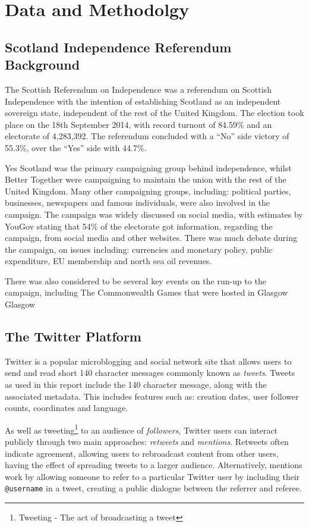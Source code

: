 \documentclass[bsc,frontabs,singlespacing,parskip]{infthesis}     %
\begin{document}
\chapter{Data and Methodolgy}
\section{Scotland Independence Referendum Background}
\label{sec:indybackground}
The Scottish Referendum on Independence was a referendum on Scottish Independence with the intention of establishing Scotland as an independent sovereign state, independent of the rest of the United Kingdom. The election took place on the 18th September 2014, with record turnout of 84.59\% and an electorate of 4,283,392. The referendum concluded with a ``No'' side victory of 55.3\%, over the ``Yes'' side with 44.7\%.

Yes Scotland was the primary campaigning group behind independence, whilst Better Together were campaigning to maintain the union with the rest of the United Kingdom. Many other campaigning groups, including: political parties, businesses, newspapers and famous individuals, were also involved in the campaign. The campaign was widely discussed on social media, with estimates by YouGov stating that 54\% of the electorate got information, regarding the campaign, from social media and other websites. There was much debate during the campaign, on issues including: currencies and monetary policy, public expenditure, EU membership and north sea oil revenues. 

There was also considered to be several key events on the run-up to the campaign, including The Commonwealth Games that were hosted in Glasgow Glasgow

\section{The Twitter Platform}
\label{sec:twitterplatform}
Twitter is a popular microblogging and social network site that allows users to send and read short 140 character messages commonly known as \textit{tweets}. Tweets as used in this report include the 140 character message, along with the associated metadata. This includes features such as: creation dates, user follower counts, coordinates and language. 

As well as tweeting\footnote{Tweeting - The act of broadcasting a tweet} to an audience of \textit{followers}, Twitter users can interact publicly through two main approaches: \textit{retweets} and \textit{mentions}. Retweets often indicate agreement\cite{retweetagreement}, allowing users to rebroadcast content from other users, having the effect of spreading tweets to a larger audience\cite{largeraudiance}. Alternatively, mentions work by allowing someone to refer to a particular Twitter user by including their \texttt{@username} in a tweet, creating a public dialogue between the referrer and referee.
\end{document}
